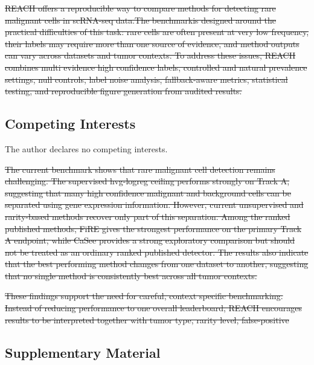 \documentclass[10pt]{article}
\providecommand{\DIFaddtex}[1]{{\protect\color{trackgreen}#1}} %
\providecommand{\DIFdeltex}[1]{{\protect\color{red}\sout{#1}}}                      %
\providecommand{\DIFaddbegin}{} %
\providecommand{\DIFaddend}{} %
\providecommand{\DIFdelbegin}{} %
\providecommand{\DIFdelend}{} %
\providecommand{\DIFadd}[1]{\texorpdfstring{\DIFaddtex{#1}}{#1}} %
\providecommand{\DIFdel}[1]{\texorpdfstring{\DIFdeltex{#1}}{}} %
\newcommand{\DIFscaledelfig}{0.5}
\newlength{\DIFdelgraphicswidth} %
\newlength{\DIFdelgraphicsheight} %
\newcommand{\DIFaddincludegraphics}[2][]{{\color{trackgreen}\fbox{\DIFOincludegraphics[#1]{#2}}}} %
\newcommand{\DIFdelincludegraphics}[2][]{%
\sbox{\DIFdelgraphicsbox}{\DIFOincludegraphics[#1]{#2}}%
\settoboxwidth{\DIFdelgraphicswidth}{\DIFdelgraphicsbox} %
\settoboxtotalheight{\DIFdelgraphicsheight}{\DIFdelgraphicsbox} %
\scalebox{\DIFscaledelfig}{%
\parbox[b]{\DIFdelgraphicswidth}{\usebox{\DIFdelgraphicsbox}\\[-\baselineskip] \rule{\DIFdelgraphicswidth}{0em}}\llap{\resizebox{\DIFdelgraphicswidth}{\DIFdelgraphicsheight}{%
\setlength{\unitlength}{\DIFdelgraphicswidth}%
\begin{picture}(1,1)%
\thicklines\linethickness{2pt} %
{\color[rgb]{1,0,0}\put(0,0){\framebox(1,1){}}}%
{\color[rgb]{1,0,0}\put(0,0){\line( 1,1){1}}}%
{\color[rgb]{1,0,0}\put(0,1){\line(1,-1){1}}}%
\end{picture}%
}\hspace*{3pt}}} %
} %
\DeclareRobustCommand{\DIFaddbegin}{\DIFOaddbegin \let\includegraphics\DIFaddincludegraphics} %
\DeclareRobustCommand{\DIFaddend}{\DIFOaddend \let\includegraphics\DIFOincludegraphics} %
\DeclareRobustCommand{\DIFdelbegin}{\DIFOdelbegin \let\includegraphics\DIFdelincludegraphics} %
\DeclareRobustCommand{\DIFdelend}{\DIFOaddend \let\includegraphics\DIFOincludegraphics} %
\begin{document}
\DIFdelbegin \DIFdel{REACH offers a reproducible way to compare methods for detecting rare malignant cells in scRNA-seq data.The benchmarkis designed around the practical difficulties of this task: rare cells are often present at very low frequency,
their labels may require more than one source of evidence, and method outputs can vary across datasets and tumor contexts. To address these issues,
REACH combines multi evidence high confidence labels, controlled and natural prevalence settings, null controls, label noise analysis, fallback-aware metrics,
statistical testing, and reproducible figure generation from audited results.
}\DIFdelend \DIFaddbegin \subsection{\DIFadd{Competing Interests}}\label{competing-interests}

\DIFadd{The author declares no competing interests.
}\DIFaddend 

\DIFdelbegin \DIFdel{The current benchmark shows that rare malignant cell detection remains challenging.
The supervised hvg-logreg ceiling performs strongly on Track A, suggesting that many high confidence malignant and background cells can be separated using gene expression information. However, current unsupervised and rarity-based methods recover only part of this separation. Among the ranked published methods, FiRE gives the strongest performance on the primary Track A endpoint, while CaSee provides a strong exploratory comparison but should not be treated as
an ordinary ranked published detector. The results also indicate that the best performing method changes from one dataset to another, suggesting that no single method is consistently best across all tumor contexts.
}\DIFdelend \DIFaddbegin \begin{center}\DIFadd{\rule{0.5\linewidth}{0.5pt}}\end{center}
\DIFaddend 

\DIFdelbegin \DIFdel{These findings support the need for careful, context specific benchmarking. Instead of reducing performance to one overall leaderboard,
REACH encourages results to be interpreted together with tumor type, rarity level, false-positive }\DIFdelend \DIFaddbegin \subsection{\DIFadd{Supplementary Material}}\label{supplementary-material}
\end{document}
